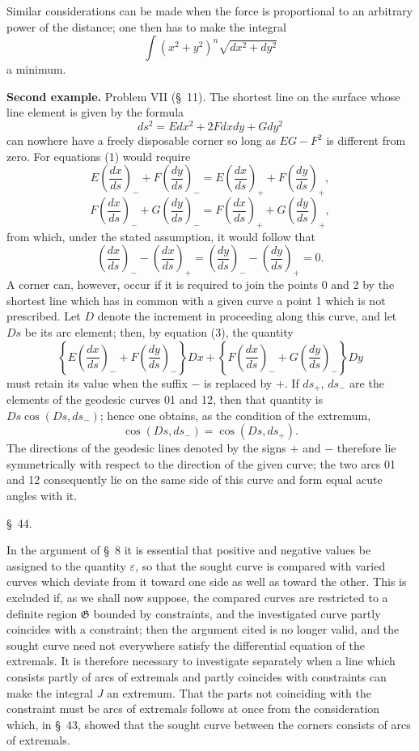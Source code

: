 \documentclass[11pt,a4paper,leqno]{article}
\begin{document}
Similar considerations can be made when the force is proportional to an arbitrary power of the distance; one then has to make the integral
\[
\int (x^2+y^2)^n\sqrt{dx^2+dy^2}
\]
a minimum.

\textbf{Second example.} Problem VII (\S~11). The shortest line on the surface whose line element is given by the formula
\[
ds^2=Edx^2+2Fdxdy+Gdy^2
\]
can nowhere have a freely disposable corner so long as $EG-F^2$ is different from zero. For equations (1) would require
\[
E\left(\frac{dx}{ds}\right)_{-}+F\left(\frac{dy}{ds}\right)_{-}
=E\left(\frac{dx}{ds}\right)_{+}+F\left(\frac{dy}{ds}\right)_{+},
\]
\[
F\left(\frac{dx}{ds}\right)_{-}+G\left(\frac{dy}{ds}\right)_{-}
=F\left(\frac{dx}{ds}\right)_{+}+G\left(\frac{dy}{ds}\right)_{+},
\]
from which, under the stated assumption, it would follow that
\[
\left(\frac{dx}{ds}\right)_{-}-\left(\frac{dx}{ds}\right)_{+}
=
\left(\frac{dy}{ds}\right)_{-}-\left(\frac{dy}{ds}\right)_{+}=0.
\]
A corner can, however, occur if it is required to join the points 0 and 2 by the shortest line which has in common with a given curve a point 1 which is not prescribed. Let $D$ denote the increment in proceeding along this curve, and let $Ds$ be its arc element; then, by equation (3), the quantity
\[
\left\{E\left(\frac{dx}{ds}\right)_{-}+F\left(\frac{dy}{ds}\right)_{-}\right\}Dx
+
\left\{F\left(\frac{dx}{ds}\right)_{-}+G\left(\frac{dy}{ds}\right)_{-}\right\}Dy
\]
must retain its value when the suffix $-$ is replaced by $+$. If $ds_+$, $ds_-$ are the elements of the geodesic curves 01 and 12, then that quantity is $Ds\cos(Ds,ds_-)$; hence one obtains, as the condition of the extremum,
\[
\cos(Ds,ds_-)=\cos(Ds,ds_+).
\]
The directions of the geodesic lines denoted by the signs $+$ and $-$ therefore lie symmetrically with respect to the direction of the given curve; the two arcs 01 and 12 consequently lie on the same side of this curve and form equal acute angles with it.

\begin{center}
{\large \S~44.}
\end{center}

In the argument of \S~8 it is essential that positive and negative values be assigned to the quantity $\varepsilon$, so that the sought curve is compared with varied curves which deviate from it toward one side as well as toward the other. This is excluded if, as we shall now suppose, the compared curves are restricted to a definite region $\mathfrak{G}$ bounded by constraints, and the investigated curve partly coincides with a constraint; then the argument cited is no longer valid, and the
sought curve need not everywhere satisfy the differential equation of the extremals. It is therefore necessary to investigate separately when a line which consists partly of arcs of extremals and partly coincides with constraints can make the integral $J$ an extremum. That the parts not coinciding with the constraint must be arcs of extremals follows at once from the consideration which, in \S~43, showed that the sought curve between the corners consists of arcs of extremals.
\end{document}
